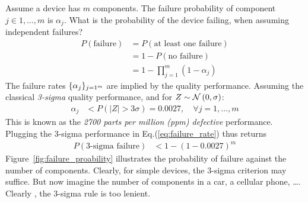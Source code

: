 \documentclass[12pt,a4paper]{report}
\begin{document}
Assume a device has $m$ components. 
The failure probability of component $j \in 1,\dots,m$ is $\alpha_j$.
What is the probability of the device failing, when assuming independent failures?
\begin{align}
\label{eq:failure_rate}
	P(\text{failure}) &= P(\text{at least one failure}) \\ \nonumber
	&= 1-P(\text{no failure}) \\ \nonumber
	&= 1-\prod_{j=1}^{m}(1-\alpha_j) 
\end{align}
The failure rates $\{ \alpha_j \}_{j=1^m}$ are implied by the quality performance. 
Assuming the classical \emph{3-sigma} quality performance, and for $Z \sim \mathcal{N}\left(0,\sigma\right)$:
\begin{align*}
	\alpha_j &< P(|Z|>3 \sigma) = 0.0027, \quad \forall j=1,\dots,m
\end{align*}
This is known as the \emph{2700 parts per million (ppm) defective} performance. 
Plugging the 3-sigma performance in Eq.(\ref{eq:failure_rate}) thus returns
\begin{align*}
	P(\text{3-sigma failure}) &< 1-(1-0.0027)^m
\end{align*}
Figure~\ref{fig:failure_proability} illustrates the probability of failure against the number of components. 
Clearly, for simple devices, the 3-sigma criterion may suffice. But now imagine the number of components in a car, a cellular phone, \dots. Clearly , the 3-sigma rule is too lenient.
\end{document}
